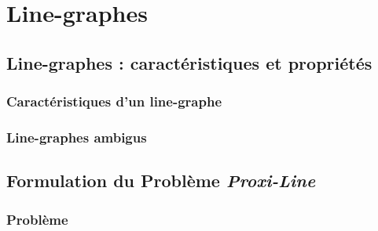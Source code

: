 \chapter{Line-graphes}
\label{linegraphesChapitre}


\section{Line-graphes : caract\'eristiques et propri\'et\'es}
	
	
	\subsection{Caract\'eristiques d'un line-graphe}
		

	\subsection{Line-graphes ambigus}
		


\section{Formulation du Probl\`eme {\em Proxi-Line}}

	

	\subsection{Probl\`eme}
		

%		

